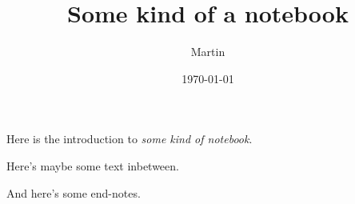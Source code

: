 \documentclass{article}
\title{Some kind of a notebook}
\author{Martin}
\date{\today}
\begin{document}
\maketitle

Here is the introduction to \emph{some kind of notebook}.



Here's maybe some text inbetween.



And here's some end-notes.
\end{document}
